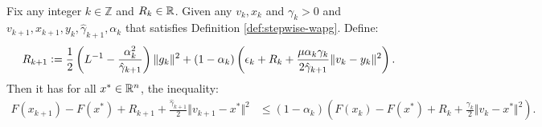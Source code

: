 \documentclass[12pt]{article}
\begin{document}
    \begin{proposition}\label{prop:stepwise-lyapunov}\;\\
        Fix any integer $k \in \mathbb Z$ and $R_k \in \mathbb R$. 
        Given any $v_k, x_k$ and $\gamma_k > 0$ and $v_{k + 1}, x_{k + 1}, y_k, \hat \gamma_{k + 1}, \alpha_k$ that satisfies Definition \ref{def:stepwise-wapg}. 
        Define: 
        \begin{align}\label{eqn:stepwise-lya-1}
            R_{k + 1}
            \vcentcolon=
            \frac{1}{2}\left(
                L^{-1} - \frac{\alpha_k^2}{\hat \gamma_{k + 1}}
            \right)\Vert g_k\Vert^2
            + 
            (1 - \alpha_k)
            \left(
                \epsilon_k + R_k + 
                \frac{\mu\alpha_k\gamma_k}{2\hat \gamma_{k + 1}}
                \Vert v_k - y_k\Vert^2
            \right). 
        \end{align}
        Then it has for all $x^* \in \mathbb R^n$, the inequality: 
        {\small
        \begin{align}\label{ineq:stepwise-lya-2}
            F(x_{k + 1}) - F(x^*) + R_{k + 1} + \frac{\hat \gamma_{k + 1}}{2}\Vert v_{k + 1} - x^*\Vert^2
            &\le 
            (1 - \alpha_k)
            \left(
                F(x_k) - F(x^*) + R_k + \frac{\gamma_{k}}{2}\Vert v_k - x^*\Vert^2
            \right). 
        \end{align}
        }
    \end{proposition}
\end{document}
